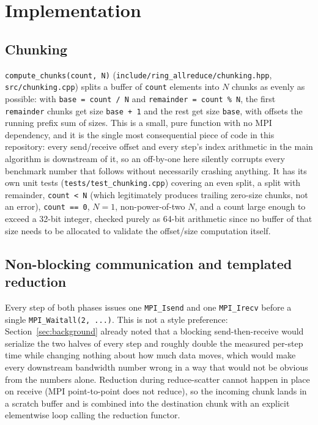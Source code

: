\section{Implementation}
\label{sec:implementation}

\subsection{Chunking}

\texttt{compute\_chunks(count, N)} (\texttt{include/ring\_allreduce/chunking.hpp}, \texttt{src/chunking.cpp}) splits a buffer of \texttt{count} elements into $N$ chunks as evenly as possible: with \texttt{base = count / N} and \texttt{remainder = count \% N}, the first \texttt{remainder} chunks get size \texttt{base + 1} and the rest get size \texttt{base}, with offsets the running prefix sum of sizes. This is a small, pure function with no MPI dependency, and it is the single most consequential piece of code in this repository: every send/receive offset and every step's index arithmetic in the main algorithm is downstream of it, so an off-by-one here silently corrupts every benchmark number that follows without necessarily crashing anything. It has its own unit tests (\texttt{tests/test\_chunking.cpp}) covering an even split, a split with remainder, \texttt{count < N} (which legitimately produces trailing zero-size chunks, not an error), \texttt{count == 0}, $N=1$, non-power-of-two $N$, and a count large enough to exceed a 32-bit integer, checked purely as 64-bit arithmetic since no buffer of that size needs to be allocated to validate the offset/size computation itself.

\subsection{Non-blocking communication and templated reduction}

Every step of both phases issues one \texttt{MPI\_Isend} and one \texttt{MPI\_Irecv} before a single \texttt{MPI\_Waitall(2, ...)}. This is not a style preference: Section~\ref{sec:background} already noted that a blocking send-then-receive would serialize the two halves of every step and roughly double the measured per-step time while changing nothing about how much data moves, which would make every downstream bandwidth number wrong in a way that would not be obvious from the numbers alone. Reduction during reduce-scatter cannot happen in place on receive (MPI point-to-point does not reduce), so the incoming chunk lands in a scratch buffer and is combined into the destination chunk with an explicit elementwise loop calling the reduction functor.

